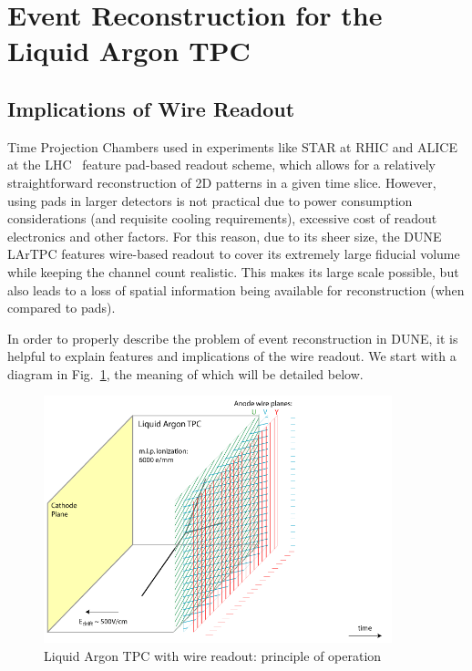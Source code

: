 \section{Event Reconstruction for the Liquid Argon TPC}
\label{sec:reconstruction}
\subsection{Implications of Wire Readout}
Time Projection Chambers used in experiments like STAR at RHIC and ALICE at the LHC~\cite{alice}  feature
pad-based readout scheme, which allows for a relatively straightforward reconstruction of 2D patterns in
a given time slice. However, using pads in larger detectors is not practical due to power consumption considerations
(and requisite cooling requirements), excessive cost of readout electronics and other factors. For this reason, due
to its sheer size, the DUNE LArTPC features wire-based readout to cover its extremely large fiducial volume while
keeping the channel count realistic. This makes its large scale possible, but also leads to a loss of spatial information
being available for reconstruction (when compared to pads).

In order to properly describe the problem of event reconstruction in DUNE, it is helpful to explain
features and implications of the wire readout. We start with a diagram in Fig.~\ref{fig:signal-0}, the meaning of which will be detailed below.
\label{sec:wirecell}
\begin{figure}[h!]
	\centering
	\includegraphics[width=0.9\textwidth]{signal-0.png}
	\caption{Liquid Argon TPC with wire readout: principle of operation}
	\label{fig:signal-0}
\end{figure}

